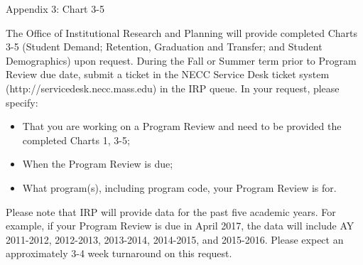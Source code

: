 Appendix 3: Chart 3-5 

The Office of Institutional Research and Planning will provide completed Charts 3-5 (Student Demand; Retention, Graduation and Transfer; and Student Demographics) upon request. During the Fall or Summer term prior to Program Review due date, submit a ticket in the NECC Service Desk ticket system (http://servicedesk.necc.mass.edu) in the IRP queue. In your request, please specify:

\begin{itemize}
  \item That you are working on a Program Review and need to be provided the completed Charts 1, 3-5;
  \item When the Program Review is due;
  \item What program(s), including program code, your Program Review is for.
\end{itemize}
    
    
    
Please note that IRP will provide data for the past five academic years. For example, if your Program Review is due in April 2017, the data will include AY 2011-2012, 2012-2013, 2013-2014, 2014-2015, and 2015-2016.
Please expect an approximately 3-4 week turnaround on this request.
